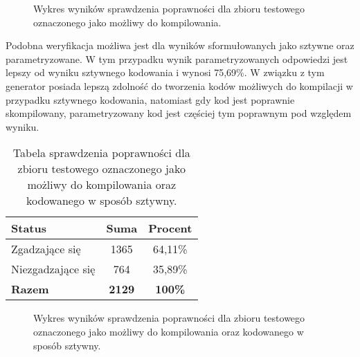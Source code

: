 \begin{figure}[H]
\centering
{}
\caption{Wykres wyników sprawdzenia poprawności dla zbioru testowego oznaczonego jako możliwy do kompilowania.}\label{rys:plama2g}
\end{figure}

Podobna weryfikacja możliwa jest dla wyników sformułowanych jako sztywne oraz parametryzowane. W tym przypadku wynik parametryzowanych odpowiedzi jest lepszy od wyniku sztywnego kodowania i wynosi 75,69\%. W związku z tym generator posiada lepszą zdolność do tworzenia kodów możliwych do kompilacji w przypadku sztywnego kodowania, natomiast gdy kod jest poprawnie skompilowany, parametryzowany kod jest częściej tym poprawnym pod względem wyniku.

\begin{table}[ht]
\caption{Tabela sprawdzenia poprawności dla zbioru testowego oznaczonego jako możliwy do kompilowania oraz kodowanego w sposób sztywny.}\label{tab:tabela8}
\centering%
\begin{tabular}{|l|c|c|}
\hline
\textbf{Status} & \textbf{Suma} & \textbf{Procent} \\
\hline
Zgadzające się & 1365 & 64,11\% \\
\hline
Niezgadzające się & 764 & 35,89\% \\
\hline
\textbf{Razem} & \textbf{2129} & \textbf{100\%} \\
\hline
\end{tabular}
\end{table}

\begin{figure}[H]
\centering
{}
\caption{Wykres wyników sprawdzenia poprawności dla zbioru testowego oznaczonego jako możliwy do kompilowania oraz kodowanego w sposób sztywny.}\label{rys:plama2h}
\end{figure}

